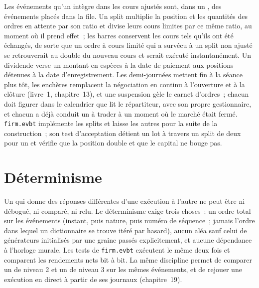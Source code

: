 Les événements qu'un  intègre dans les cours ajustés sont, dans un , des événements placés dans la file. Un split multiplie la position et les
quantités des ordres en attente par son ratio et divise leurs cours limites par ce même ratio, au moment où il prend effet~; les barres conservent les cours tels qu'ils ont été échangés, de sorte que
un ordre à cours limité qui a survécu à un split non ajusté se retrouverait au double du nouveau cours et serait exécuté instantanément. Un dividende verse un montant en espèces à la date de paiement aux positions
détenues à la date d'enregistrement. Les demi-journées mettent fin à la séance plus tôt, les enchères remplacent la négociation en continu à l'ouverture et à la clôture (livre~1, chapitre~13), et une suspension
gèle le carnet d'ordres~; chacun doit figurer dans le calendrier que lit le répartiteur, avec son propre gestionnaire, et chacun a déjà conduit un  à trader à un moment où le marché
était fermé. \texttt{firm.evbt} implémente les splits et laisse les autres pour la suite de la construction~; son test d'acceptation détient un lot à travers un split de
deux pour un et vérifie que la position double et que le capital ne bouge pas.

\section{Déterminisme}

Un  qui donne des réponses différentes d'une exécution à l'autre ne peut être ni débogué, ni comparé, ni relu. Le déterminisme exige trois choses~: un ordre total sur les événements
(instant, puis nature, puis numéro de séquence~; jamais l'ordre dans lequel un dictionnaire se trouve itéré par hasard), aucun aléa sauf celui de générateurs initialisés par une graine passés
explicitement, et aucune dépendance à l'horloge murale. Les tests de \texttt{firm.evbt} exécutent le même  deux fois et comparent les rendements nets bit à bit. La
même discipline permet de comparer un  de niveau 2 et un  de niveau 3 sur les mêmes événements, et de rejouer une exécution en direct à partir de ses journaux (chapitre~19).

